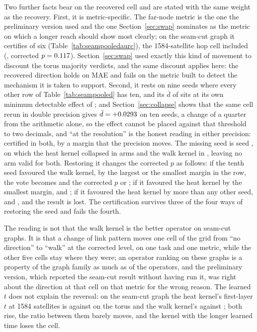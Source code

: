 \documentclass[preprint,11pt,3p]{elsarticle}
\begin{document}
Two further facts bear on the recovered cell and are stated with the same weight as the
recovery. First, it is metric-specific. The far-node metric is the one the preliminary version
used and the one Section~\ref{sec:swap} nominates as the metric on which a longer reach should
show most clearly; on the seam-cut graph it certifies \numSeamPooledSigHolmAurc{} of six
(Table~\ref{tab:seampooledaurc}), the 1584-satellite hop cell included
(\numSeamPooledAurcHopsShellOneWins{}, corrected $p=0.117$).
Section~\ref{sec:swap} used exactly this kind of movement to discount the torus majority
verdicts, and the same discount applies here: the recovered direction holds on MAE and fails on
the metric built to detect the mechanism it is taken to support. Second, it rests on nine seeds
where every other row of Table~\ref{tab:seampooled} has ten, and its $\bar d$ of
\numSeamPooledHopsShellOneD{} sits at its own minimum detectable effect of
\numSeamPooledHopsShellOneMde; and Section~\ref{sec:collapse} shows that the same cell rerun in
double precision gives $\bar d=+0.0293$ on ten seeds, a change of a
quarter from the arithmetic alone, so the effect cannot be placed against that threshold to two
decimals, and ``at the resolution'' is the honest reading in either precision: certified in both,
by a margin that the precision moves. The missing seed is seed \numSeamMissingSeeds, on which the heat
kernel collapsed in \numSeamMissingSeedPathHeat{} arms and the walk kernel in
\numSeamMissingSeedPathWalk{}, leaving no arm valid for both. Restoring it changes the corrected
$p$ as follows: if the tenth seed favoured the walk kernel, by the largest or the smallest
margin in the row, the vote becomes \numSeamRestoreWalkLargeWins{} and the corrected $p$
\numSeamRestoreWalkLargeHolm{} or \numSeamRestoreWalkSmallHolm; if it favoured the heat kernel
by the smallest margin, \numSeamRestoreHeatSmallWins{} and \numSeamRestoreHeatSmallHolm; if it
favoured the heat kernel by more than any other seed, \numSeamRestoreHeatLargeWins{} and
\numSeamRestoreHeatLargeHolm, and the result is lost. The certification survives three of the
four ways of restoring the seed and fails the fourth.

The reading is not that the walk kernel is the better operator on seam-cut graphs. It is that a
change of link pattern moves one cell of the grid from ``no direction'' to ``walk'' at the
corrected level, on one task and one metric, while the other five cells stay where they were; an
operator ranking on these graphs is a property of the graph family as much as of the operators,
and the preliminary version, which reported the seam-cut result without having run it, was right
about the direction at that cell on that metric for the wrong reason. The learned $t$ does not
explain the reversal: on the seam-cut graph the heat kernel's first-layer $t$ at 1584 satellites
is \numSeamTlayerOneShellOneHeat{} against \numTlayerOneShellOneHeat{} on the torus and the walk
kernel's \numSeamTlayerOneShellOneWalk{} against \numTlayerOneShellOneWalk{}; both rise, the
ratio between them barely moves, and the kernel with the longer learned time loses the cell.
\end{document}
